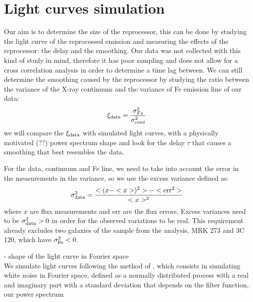\section{Light curves simulation}
Our aim is to determine the size of the reprocessor, this can be done by studying the light curve of the reprocessed emission and measuring the effects of the reprocessor: the delay and the smoothing. Our data was not collected with this kind of study in mind, therefore it has poor sampling and does not allow for a cross correlation analysis in order to determine a time lag between. We can still determine the smoothing caused by the reprocessor by studying the ratio between the variance of the X-ray continuum and the variance of Fe emission line of our data:
\begin{equation}
    \xi_{\rm data}=\frac{\sigma^2_{Fe}}{\sigma^2_{cont}}
\end{equation}
we will compare the $\xi_{\rm data}$ with simulated light curves, with a physically motivated (??) power spectrum shape and look for the delay $\tau$ that causes a smoothing that best resembles the data.

For the data, continuum and Fe line, we need to take into account the error in the measurements in the variance, so we use the excess variance defined as:
\begin{equation}
    \sigma^2_{\rm data}= \frac{<(x-<x>)^2> - < \rm err^2 >}{<x>^2}
\end{equation}
where $x$ are flux measurements and err are the flux errors. Excess variances need to be $\sigma^2_{\rm data}>0$ in order for the observed variations to be real. This requirement already excludes two galaxies of the sample from the analysis, MRK 273 and 3C 120, which have $\sigma^2_{\rm Fe}<0$.

- shape of the light curve in Fourier space \\
We simulate light curves following the method of \citet{1995A&A...300..707T}, which consists in simulating white noise in Fourier space, defined as a normally distributed process with a real and imaginary part with a standard deviation that depends on the filter function, our power spectrum


